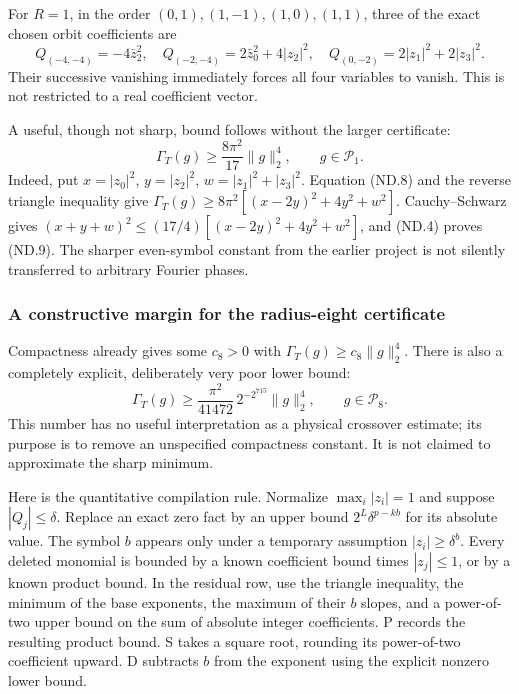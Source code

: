 For \(R=1\), in the order \((0,1),(1,-1),(1,0),(1,1)\), three of the exact chosen orbit coefficients are \[
 Q_{(-4,-4)}=-4\bar z_2^2,\quad
 Q_{(-2,-4)}=2\bar z_0^2+4|z_2|^2,\quad
 Q_{(0,-2)}=2|z_1|^2+2|z_3|^2.                              \tag{ND.8}
\] Their successive vanishing immediately forces all four variables to vanish. This is not restricted to a real coefficient vector.

A useful, though not sharp, bound follows without the larger certificate: \[
              \Gamma_T(g)\geq\frac{8\pi^2}{17}\|g\|_2^4,
                         \qquad g\in\mathcal P_1.          \tag{ND.9}
\] Indeed, put \(x=|z_0|^2\), \(y=|z_2|^2\), \(w=|z_1|^2+|z_3|^2\). Equation (ND.8) and the reverse triangle inequality give \(\Gamma_T(g)\geq8\pi^2[(x-2y)^2+4y^2+w^2]\). Cauchy--Schwarz gives \((x+y+w)^2\leq(17/4)[(x-2y)^2+4y^2+w^2]\), and (ND.4) proves (ND.9). The sharper even-symbol constant from the earlier project is not silently transferred to arbitrary Fourier phases.

\subsubsection{A constructive margin for the radius-eight certificate}\label{nondegeneracy:a-constructive-margin-for-the-radius-eight-certificate}

Compactness already gives some \(c_8>0\) with \(\Gamma_T(g)\geq c_8\|g\|_2^4\). There is also a completely explicit, deliberately very poor lower bound: \[
 \boxed{\displaystyle
 \Gamma_T(g)\geq \frac{\pi^2}{41472}\,2^{-2^{715}}\|g\|_2^4,
                         \qquad g\in\mathcal P_8.}          \tag{ND.10}
\] This number has no useful interpretation as a physical crossover estimate; its purpose is to remove an unspecified compactness constant. It is not claimed to approximate the sharp minimum.

Here is the quantitative compilation rule. Normalize \(\max_i|z_i|=1\) and suppose \(|Q_j|\leq\delta\). Replace an exact zero fact by an upper bound \(2^L\delta^{p-kb}\) for its absolute value. The symbol \(b\) appears only under a temporary assumption \(|z_i|\geq\delta^b\). Every deleted monomial is bounded by a known coefficient bound times \(|z_j|\leq1\), or by a known product bound. In the residual row, use the triangle inequality, the minimum of the base exponents, the maximum of their \(b\) slopes, and a power-of-two upper bound on the sum of absolute integer coefficients. P records the resulting product bound. S takes a square root, rounding its power-of-two coefficient upward. D subtracts \(b\) from the exponent using the explicit nonzero lower bound.

